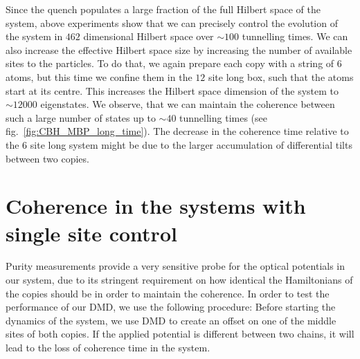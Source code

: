 Since the quench populates a large fraction of the full Hilbert space of the system, above experiments show that we can precisely control the evolution of the system in $462$ dimensional Hilbert space over $\sim 100$ tunnelling times. We can also increase the effective Hilbert space size by increasing the number of available sites to the particles. To do that, we again prepare each copy with a string of $6$ atoms, but this time we confine them in the $12$ site long box, such that the atoms start at its centre. This increases the Hilbert space dimension of the system to $\sim 12 000$ eigenstates. We observe, that we can maintain the coherence between such a large number of states up to $\sim 40$ tunnelling times (see fig.~\ref{fig:CBH_MBP_long_time}). The decrease in the coherence time relative to the $6$ site long system might be due to the larger accumulation of differential tilts between two copies.  

\section{Coherence in the systems with single site control} 
Purity measurements provide a very sensitive probe for the optical potentials in our system, due to its stringent requirement on how identical the Hamiltonians of the copies should be in order to maintain the coherence. In order to test the performance of our DMD, we use the following procedure: Before starting the dynamics of the system, we use DMD to create an offset on one of the middle sites of both copies. If the applied potential is different between two chains, it will lead to the loss of coherence time in the system.

